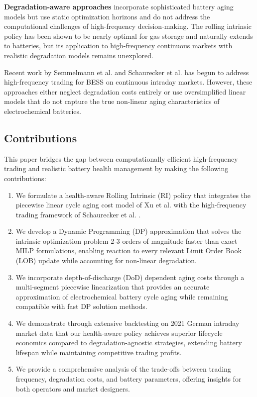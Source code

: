 \documentclass[10pt,twocolumn]{article}
\begin{document}
\textbf{Degradation-aware approaches} \cite{xu2017factoring, graf2022drives} incorporate sophisticated battery aging models but use static optimization horizons and do not address the computational challenges of high-frequency decision-making. The rolling intrinsic policy has been shown to be nearly optimal for gas storage \cite{lohndorf2021gas} and naturally extends to batteries, but its application to high-frequency continuous markets with realistic degradation models remains unexplored.

Recent work by Semmelmann et al. \cite{semmelmann2025algorithm} and Schaurecker et al. \cite{schaurecker2025maximizing} has begun to address high-frequency trading for BESS on continuous intraday markets. However, these approaches either neglect degradation costs entirely or use oversimplified linear models that do not capture the true non-linear aging characteristics of electrochemical batteries.

\subsection{Contributions}

This paper bridges the gap between computationally efficient high-frequency trading and realistic battery health management by making the following contributions:

\begin{enumerate}
\item We formulate a health-aware Rolling Intrinsic (RI) policy that integrates the piecewise linear cycle aging cost model of Xu et al. \cite{xu2017factoring} with the high-frequency trading framework of Schaurecker et al. \cite{schaurecker2025maximizing}.

\item We develop a Dynamic Programming (DP) approximation that solves the intrinsic optimization problem 2-3 orders of magnitude faster than exact MILP formulations, enabling reaction to every relevant Limit Order Book (LOB) update while accounting for non-linear degradation.

\item We incorporate depth-of-discharge (DoD) dependent aging costs through a multi-segment piecewise linearization that provides an accurate approximation of electrochemical battery cycle aging while remaining compatible with fast DP solution methods.

\item We demonstrate through extensive backtesting on 2021 German intraday market data that our health-aware policy achieves superior lifecycle economics compared to degradation-agnostic strategies, extending battery lifespan while maintaining competitive trading profits.

\item We provide a comprehensive analysis of the trade-offs between trading frequency, degradation costs, and battery parameters, offering insights for both operators and market designers.
\end{enumerate}
\end{document}
